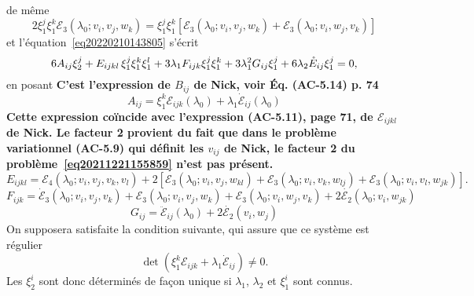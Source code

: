 \documentclass[12pt, final]{amsart}
\begin{document}
de m{\^e}me
\begin{equation}
  2 \xi_1^j \xi_1^k \mathcal{E}_3 (\lambda_0 ; v_i, v_j, w_k) = \xi_1^j
  \xi_1^k  [\mathcal{E}_3 (\lambda_0 ; v_i, v_j, w_k) +\mathcal{E}_3
  (\lambda_0 ; v_i, w_j, v_k)]
\end{equation}
et l'équation~\eqref{eq20220210143805} s'écrit
\begin{equation}
  \label{eq20220216141706} 6 A_{i  j} \xi_2^j + E_{i  j
   k  l}  \hspace{0.17em} \xi_1^j \xi_1^k \xi_1^l + 3
  \lambda_1 F_{i  j  k} \xi_1^j \xi_1^k + 3 \lambda_1^2 G_{i
   j} \xi_1^j + 6 \lambda_2  \mathring{E}_{i  j} \xi_1^j = 0,
\end{equation}
en posant \textbf{C'est l'expression de $B_{ij}$ de Nick, voir Éq.
(AC-5.14) p. 74}
\begin{equation}
  A_{i  j} = \xi_1^k \mathcal{E}_{i  j  k} (\lambda_0)
  + \lambda_1  \dot{\mathcal{E}}_{i  j} (\lambda_0)
\end{equation}
\textbf{Cette expression co{\"i}ncide avec l'expression (AC-5.11), page 71,
de $\mathcal{E}_{i  j  k  l}$ de Nick. Le facteur 2
provient du fait que dans le probl{\`e}me variationnel (AC-5.9) qui
définit les $v_{i  j}$ de Nick, le facteur 2 du
probl{\`e}me~\eqref{eq20211221155859} n'est pas présent.}
\begin{equation}
  E_{i  j  k  l} =\mathcal{E}_4  (\lambda_0 ; v_i,
  v_j, v_k, v_l) + 2 [\mathcal{E}_3 (\lambda_0 ; v_i, v_j, w_{k  l})
  +\mathcal{E}_3 (\lambda_0 ; v_i, v_k, w_{l  j}) +\mathcal{E}_3
  (\lambda_0 ; v_i, v_l, w_{j  k})] .
\end{equation}
\begin{equation}
  F_{i  j  k} = \dot{\mathcal{E}}_3  (\lambda_0 ; v_i, v_j,
  v_k) +\mathcal{E}_3  (\lambda_0 ; v_i, v_j, w_k) +\mathcal{E}_3  (\lambda_0
  ; v_i, w_j, v_k) + 2 \dot{\mathcal{E}_2} (\lambda_0 ; v_i, w_{j  k})
\end{equation}
\begin{equation}
  G_{i  j} = \ddot{\mathcal{E}}_{i  j} (\lambda_0) + 2
  \dot{\mathcal{E}_2} (v_i, w_j)
\end{equation}
On supposera satisfaite la condition suivante, qui assure que ce syst{\`e}me
est régulier
\begin{equation}
  \det (\xi_1^k \mathcal{E}_{i  j  k} + \lambda_1
  \dot{\mathcal{E}}_{i  j}) \neq 0.
\end{equation}
Les $\xi_2^i$ sont donc déterminés de fa{\c c}on unique si
$\lambda_1$, $\lambda_2$ et $\xi_1^i$ sont connus.
\end{document}
